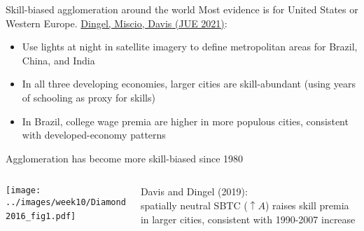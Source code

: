 \documentclass[11pt,notes=hide,aspectratio=169]{beamer}
\begin{document}
\begin{frame}{Skill-biased agglomeration around the world}
Most evidence is for United States or Western Europe.
\medskip
\href{http://www.jdingel.com/research/DingelMiscioDavis.pdf}{Dingel, Miscio, Davis (JUE 2021)}:
\begin{itemize}
\item Use lights at night in satellite imagery to define metropolitan areas for Brazil, China, and India
\item In all three developing economies, larger cities are skill-abundant
(using years of schooling as proxy for skills)
\item In Brazil, college wage premia are higher in more populous cities, consistent with developed-economy patterns
\end{itemize}
\end{frame}
\begin{frame}{Agglomeration has become more skill-biased since 1980}
\begin{columns}
\begin{column}{.60\textwidth}
\begin{center}
\texttt{[image: ../images/week10/Diamond2016\_fig1.pdf]}\
\end{center}
\end{column}
\begin{column}{.38\textwidth}
Davis and Dingel (2019):\\
spatially neutral SBTC ($\uparrow A$) raises skill premia in larger cities,
consistent with 1990-2007 increase
\end{column}
\end{columns}
\end{frame}
\end{document}
